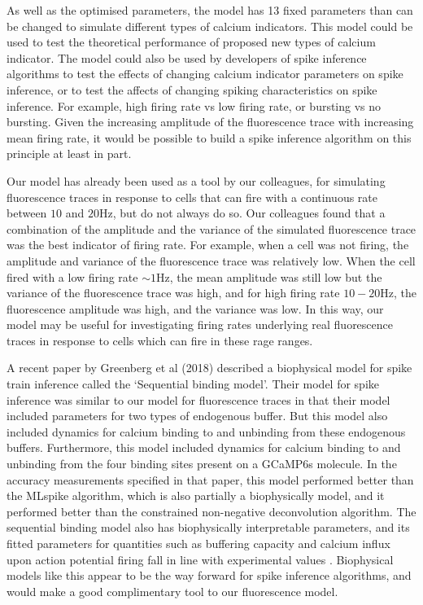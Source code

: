As well as the optimised parameters, the model has 13 fixed parameters than can be changed to simulate different types of calcium indicators. This model could be used to test the theoretical performance of proposed new types of calcium indicator. The model could also be used by developers of spike inference algorithms to test the effects of changing calcium indicator parameters on spike inference, or to test the affects of changing spiking characteristics on spike inference. For example, high firing rate vs low firing rate, or bursting vs no bursting. Given the increasing amplitude of the fluorescence trace with increasing mean firing rate, it would be possible to build a spike inference algorithm on this principle at least in part.

Our model has already been used as a tool by our colleagues, for simulating fluorescence traces in response to cells that can fire with a continuous rate between $10$ and $20$Hz, but do not always do so. Our colleagues found that a combination of the amplitude and the variance of the simulated fluorescence trace was the best indicator of firing rate. For example, when a cell was not firing, the amplitude and variance of the fluorescence trace was relatively low. When the cell fired with a low firing rate $\sim 1$Hz, the mean amplitude was still low but the variance of the fluorescence trace was high, and for high firing rate $10-20$Hz, the fluorescence amplitude was high, and the variance was low. In this way, our model may be useful for investigating firing rates underlying real fluorescence traces in response to cells which can fire in these rage ranges.

A recent paper by Greenberg et al (2018) described a biophysical model for spike train inference called the `Sequential binding model'. Their model for spike inference was similar to our model for fluorescence traces in that their model included parameters for two types of endogenous buffer. But this model also included dynamics for calcium binding to and unbinding from these endogenous buffers. Furthermore, this model included dynamics for calcium binding to and unbinding from the four binding sites present on a GCaMP6s molecule. In the accuracy measurements specified in that paper, this model performed better than the MLspike algorithm, which is also partially a biophysically model, and it performed better than the constrained non-negative deconvolution algorithm. The sequential binding model also has biophysically interpretable parameters, and its fitted parameters for quantities such as buffering capacity and calcium influx upon action potential firing fall in line with experimental values \parencite{greenberg}. Biophysical models like this appear to be the way forward for spike inference algorithms, and would make a good complimentary tool to our fluorescence model.
